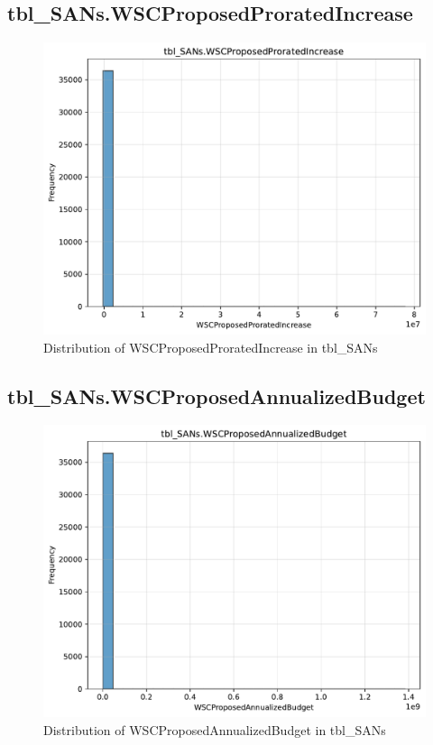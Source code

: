\subsection{tbl\_SANs.WSCProposedProratedIncrease}

\begin{figure}[htbp]
\centering
\includegraphics[width=\textwidth]{figures/dbo_tbl_SANs_WSCProposedProratedIncrease.pdf}
\caption{Distribution of WSCProposedProratedIncrease in tbl\_SANs}
\end{figure}\newpage

\subsection{tbl\_SANs.WSCProposedAnnualizedBudget}

\begin{figure}[htbp]
\centering
\includegraphics[width=\textwidth]{figures/dbo_tbl_SANs_WSCProposedAnnualizedBudget.pdf}
\caption{Distribution of WSCProposedAnnualizedBudget in tbl\_SANs}
\end{figure}\newpage

